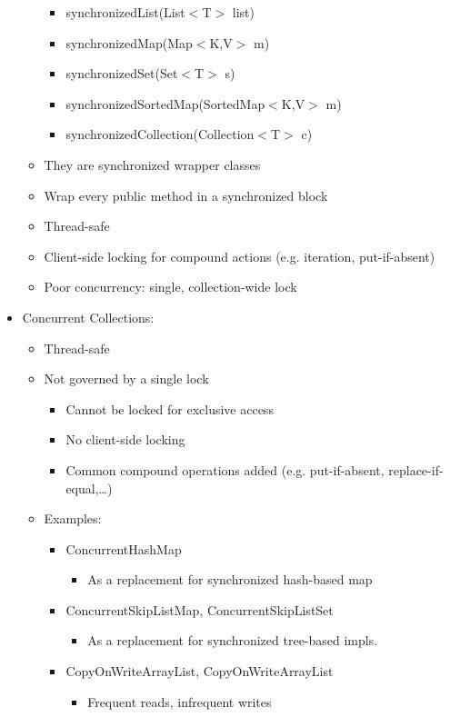\documentclass[a4paper]{article}
\begin{document}
\begin{itemize}
\begin{itemize}
\begin{itemize}
\item synchronizedList(List$<$T$>$ list)
\item synchronizedMap(Map$<$K,V$>$ m)
\item synchronizedSet(Set$<$T$>$ s)
\item synchronizedSortedMap(SortedMap$<$K,V$>$ m)
\item synchronizedCollection(Collection$<$T$>$ c)
\end{itemize}
\item They are synchronized wrapper classes
\item Wrap every public method in a synchronized block
\item Thread-safe
\item Client-side locking for compound actions (e.g. iteration, put-if-absent)
\item Poor concurrency: single, collection-wide lock
\end{itemize}
\item Concurrent Collections: 
\begin{itemize}
\item Thread-safe
\item Not governed by a single lock
\begin{itemize}
\item Cannot be locked for exclusive access
\item No client-side locking
\item Common compound operations added (e.g. put-if-absent, replace-if-equal,\dots)
\end{itemize}
\item Examples:
\begin{itemize}
\item ConcurrentHashMap 
\begin{itemize}
\item As a replacement for synchronized hash-based map
\end{itemize}
\item ConcurrentSkipListMap, ConcurrentSkipListSet
\begin{itemize}
\item As a replacement for synchronized tree-based impls.
\end{itemize}
\item CopyOnWriteArrayList, CopyOnWriteArrayList
\begin{itemize}
\item Frequent reads, infrequent writes
\end{itemize}

\end{itemize}
\end{itemize}
\end{itemize}
\end{document}
